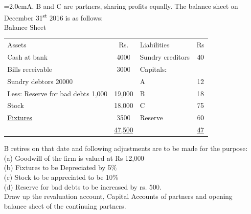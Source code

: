 \documentclass[11pt,a4paper]{article}
\newcommand{\lqn}[2]{\Needspace{6\baselineskip}\par\medskip\noindent\hangindent=2.0em\hangafter=1\makebox[2.0em][l]{\textbf{#1.}}#2\par}
\begin{document}
\lqn{102}{A, B and C are partners, sharing profits equally. The balance sheet on December 31\textsuperscript{st} 2016 is as follows:\\
Balance Sheet\par
\par\smallskip\noindent\hspace*{1.2em}\begin{tabular}{lclc}
Assets & Rs. & Liabilities & Rs \\
Cash at bank & 4000 & Sundry creditors & 40 \\
Bills receivable & 3000 & Capitals: &  \\
Sundry debtors 20000 &  & A & 12 \\
Less: Reserve for bad debts  1,000 & 19,000 & B & 18 \\
Stock & 18,000 & C & 75 \\
\underline{Fixtures} & 3500 & Reserve & 60 \\
 & \underline{\underline{47,500}} &  & \underline{\underline{47}} \\
\end{tabular}\par\smallskip
B retires on that date and following adjustments are to be made for the purpose:\\
(a) Goodwill of the firm is valued at Rs 12,000\\
(b) Fixtures to be Depreciated by 5\%\\
(c) Stock to be appreciated to be 10\%\\
(d) Reserve for bad debts to be increased by rs. 500.\\
Draw up the revaluation account, Capital Accounts of partners and opening balance sheet of the continuing partners.\par
}
\end{document}
